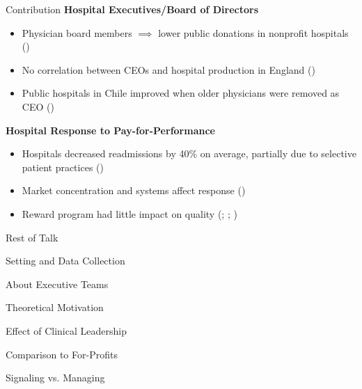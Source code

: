 \documentclass[notes,11pt, aspectratio=169]{beamer}
\begin{document}
\begin{frame}{Contribution}
    \textbf{Hospital Executives/Board of Directors}
    \begin{itemize}
        \item Physician board members $\implies$ lower public donations in nonprofit hospitals \scriptsize (\cite{brickley2010board}) \normalsize
        \item No correlation between CEOs and hospital production in England \scriptsize (\cite{janke2019impact})\normalsize
        \item Public hospitals in Chile improved when older physicians were removed as CEO \scriptsize (\cite{otero2022managers}) \normalsize
    \end{itemize}

    \vspace{5mm}

    \textbf{Hospital Response to Pay-for-Performance}
    \begin{itemize}
        \item Hospitals decreased readmissions by 40\% on average, partially due to selective patient practices \scriptsize (\cite{gupta2021impacts}) \normalsize
        \item Market concentration and systems affect response \scriptsize (\cite{kunz2024assessing}) \normalsize
        \item Reward program had little impact on quality \scriptsize (\cite{us2015hospital}; \cite{norton2018moneyball}; \cite{friedson2019so})
    \end{itemize}
\end{frame}

\begin{frame}{Rest of Talk}

    Setting and Data Collection

    \vspace{4mm}

    About Executive Teams

    \vspace{4mm}

    Theoretical Motivation

    \vspace{4mm}

    Effect of Clinical Leadership

    \vspace{4mm}

    Comparison to For-Profits

    \vspace{4mm}

    Signaling vs. Managing
\end{frame}
\end{document}
